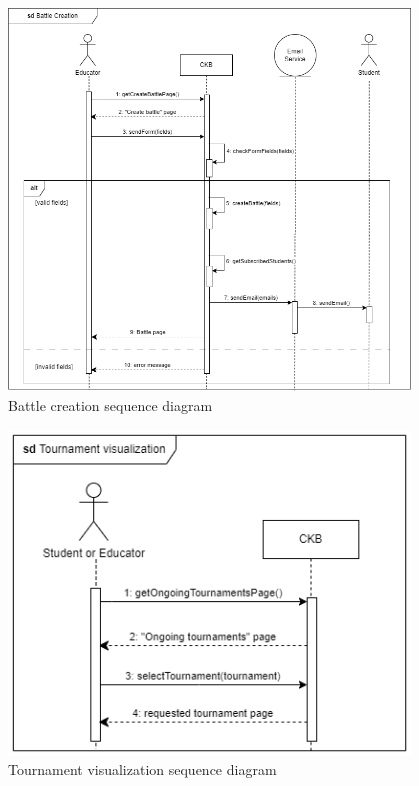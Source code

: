 \begin{figure}[H]
    \centering
    \includegraphics[width=0.95\textwidth]{images/seq_diagrams/battle_creation.png}
    \caption{Battle creation sequence diagram}
\end{figure}
\clearpage

\begin{figure}[H]
    \centering
    \includegraphics[width=0.95\textwidth]{images/seq_diagrams/tournament_visualization.png}
    \caption{Tournament visualization sequence diagram}
\end{figure}
\clearpage

